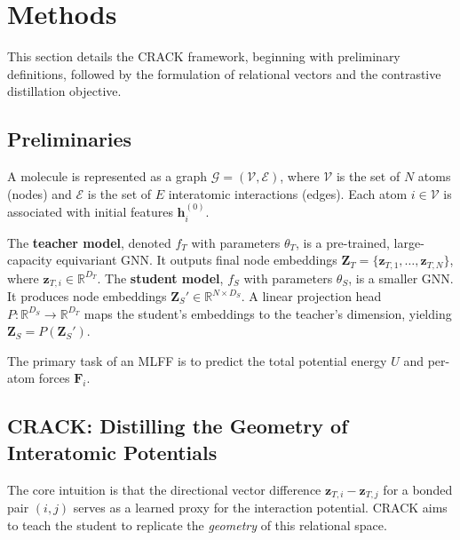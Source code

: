 \documentclass{article}
\begin{document}
\section{Methods}

This section details the CRACK framework, beginning with preliminary definitions, followed by the formulation of relational vectors and the contrastive distillation objective.


\subsection{Preliminaries}

A molecule is represented as a graph $\mathcal{G} = (\mathcal{V}, \mathcal{E})$, where $\mathcal{V}$ is the set of $N$ atoms (nodes) and $\mathcal{E}$ is the set of $E$ interatomic interactions (edges). Each atom $i \in \mathcal{V}$ is associated with initial features $\mathbf{h}_i^{(0)}$.

The \textbf{teacher model}, denoted $f_T$ with parameters $\theta_T$, is a pre-trained, large-capacity equivariant GNN. It outputs final node embeddings $\mathbf{Z}_T = \{\mathbf{z}_{T,1}, \dots, \mathbf{z}_{T,N}\}$, where $\mathbf{z}_{T,i} \in \mathbb{R}^{D_T}$. 
The \textbf{student model}, $f_S$ with parameters $\theta_S$, is a smaller GNN. It produces node embeddings $\mathbf{Z}_S' \in \mathbb{R}^{N \times D_S}$. A linear projection head $P: \mathbb{R}^{D_S} \to \mathbb{R}^{D_T}$ maps the student's embeddings to the teacher's dimension, yielding $\mathbf{Z}_S = P(\mathbf{Z}_S')$.

The primary task of an MLFF is to predict the total potential energy $U$ and per-atom forces $\mathbf{F}_i$.


\subsection{CRACK: Distilling the Geometry of Interatomic Potentials}

The core intuition is that the directional vector difference $\mathbf{z}_{T,i} - \mathbf{z}_{T,j}$ for a bonded pair $(i, j)$ serves as a learned proxy for the interaction potential. CRACK aims to teach the student to replicate the \textit{geometry} of this relational space.

\end{document}
